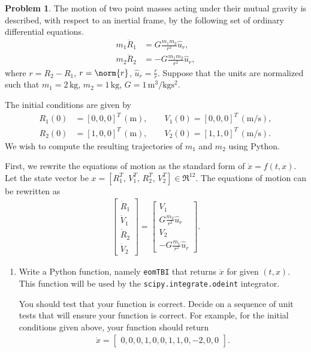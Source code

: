 \documentclass[10pt]{article}
\theoremstyle{definition}
\newtheorem{prob}{Problem}[section]
\newenvironment{subprob}%
{\renewcommand{\theenumi}{\alph{enumi}}\renewcommand{\labelenumi}{(\theenumi)}\begin{enumerate}}%
{\end{enumerate}}%
\begin{document}
\begin{prob}
The motion of two point masses acting under their mutual gravity is described, with respect to an inertial frame, by the following set of ordinary differential equations.
\begin{align}
m_1\ddot{{R}}_1 & = G \frac{m_1 m_2}{r^2} \hat u_r,\\
m_2\ddot{{R}}_2 & = -G \frac{m_1 m_2}{r^2} \hat u_r,
\end{align}
where $ r= R_2 - R_1$, $r=\norm{ r}$, $\hat u_r = \frac{ r}{r}$. Suppose that the units are normalized such that $m_1=2\,\mathrm{kg}$, $m_2=1\,\mathrm{kg}$, $G=1\,\mathrm{m^3/kg s^2}$.

The initial conditions are given by
\begin{align*}
 R_1(0)&=[0,0,0]^T\,(\mathrm{m}), \qquad  V_1(0)=[0,0,0]^T\,(\mathrm{m/s}),\\
 R_2(0)&=[1,0,0]^T\,(\mathrm{m}), \qquad  V_2(0)=[1,1,0]^T\,(\mathrm{m/s}).
\end{align*}
We wish to compute the resulting trajectories of $m_1$ and $m_2$ using Python. 


First, we rewrite the equations of motion as the standard form of $\dot x = f(t,x)$. Let the state vector be $x=[R_1^T,\,V_1^T,\, R_2^T,\, V_2^T]\in\Re^{12}$. The equations of motion can be rewritten as
\begin{align}
\begin{bmatrix} \dot R_1 \\ \dot V_1 \\ \dot R_2 \\ \dot V_2\end{bmatrix}
=
\begin{bmatrix}
V_1 \\
G\frac{m_2}{r^2} \hat u_r\\
V_2 \\
-G\frac{m_1}{r^2} \hat u_r
\end{bmatrix}.
\end{align}


\begin{subprob}

\item Write a Python function, namely \texttt{eomTBI} that returns $\dot x$ for given $(t,x)$. This function will be used by the \texttt{scipy.integrate.odeint} integrator.

You should test that your function is correct.
Decide on a sequence of unit tests that will ensure your function is correct. 
For example, for the initial conditions given above, your function should return 
\begin{align}
    \dot{x} = \begin{bmatrix} 0 , 0 , 0 , 1 , 0 , 0 , 1 , 1 , 0 , -2 , 0 , 0 \end{bmatrix} .
\end{align}



\end{subprob}
\end{prob}
\end{document}
